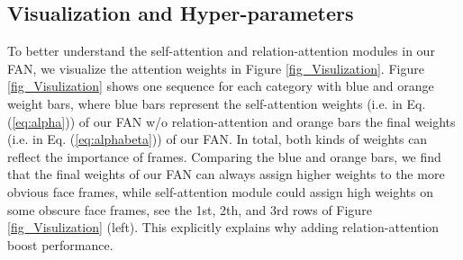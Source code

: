 \documentclass{article}
\begin{document}
\begin{table}[tp]
\center

\caption{Evaluation of our FAN with a comparison to state-of-the-art methods on AFEW 8.0 database. It is worth noting that we only compare to the best \textit{single} models of previous works.}
\label{tab:afew}
\end{table}

\subsection{Visualization and Hyper-parameters}
To better understand the self-attention and relation-attention modules in our FAN, we visualize the attention weights in Figure \ref{fig_Visulization}. Figure \ref{fig_Visulization} shows one sequence for each category with blue and orange weight bars, where blue bars represent the self-attention weights (i.e.  in Eq. (\ref{eq:alpha})) of our FAN w/o relation-attention and orange bars the final weights (i.e.  in Eq. (\ref{eq:alphabeta})) of  our FAN.
In total, both kinds of weights can reflect the importance of frames.
Comparing the blue and orange bars, we find that the final weights of our FAN can always assign higher weights to the more obvious face frames, while self-attention module could assign high weights on some obscure face frames, see the 1st, 2th, and 3rd rows of Figure \ref{fig_Visulization} (left). This explicitly explains why adding relation-attention boost performance. 
\end{document}
